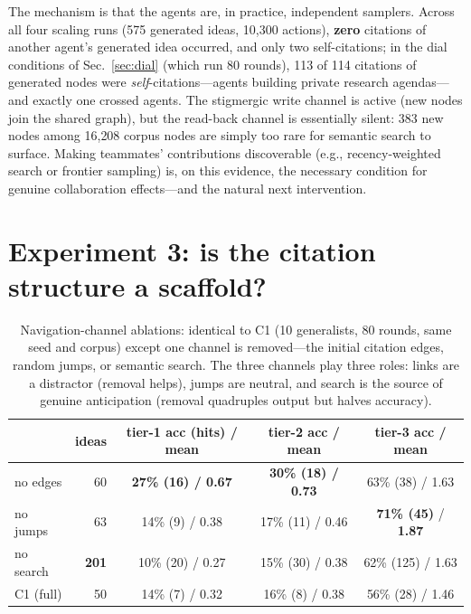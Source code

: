 \documentclass{article} %
\begin{document}
The mechanism is that the agents are, in practice, independent samplers.
Across all four scaling runs (575 generated ideas, 10{,}300 actions),
\textbf{zero} citations of another agent's generated idea occurred, and
only two self-citations; in the dial conditions of
Sec.~\ref{sec:dial} (which run 80 rounds), 113 of 114 citations of
generated nodes were \emph{self}-citations---agents building private
research agendas---and exactly one crossed agents. The stigmergic write
channel is active (new nodes join the shared graph), but the read-back
channel is essentially silent: 383 new nodes among 16{,}208 corpus nodes
are simply too rare for semantic search to surface. Making teammates'
contributions discoverable (e.g., recency-weighted search or frontier
sampling) is, on this evidence, the necessary condition for genuine
collaboration effects---and the natural next intervention.

\section{Experiment 3: is the citation structure a scaffold?}
\label{sec:noedges}

\begin{table}[t]
\caption{Navigation-channel ablations: identical to C1 (10 generalists,
80 rounds, same seed and corpus) except one channel is removed---the
initial citation edges, random jumps, or semantic search. The three
channels play three roles: links are a distractor (removal helps),
jumps are neutral, and search is the source of genuine anticipation
(removal quadruples output but halves accuracy).}
\label{tab:noedges}
\begin{center}\small
\begin{tabular}{lrccc}
\toprule
 & \textbf{ideas} & \textbf{tier-1 acc (hits) / mean} &
 \textbf{tier-2 acc / mean} & \textbf{tier-3 acc / mean} \\
\midrule
no edges & 60 & \textbf{27\% (16) / 0.67} & \textbf{30\% (18) / 0.73} & 63\% (38) / 1.63 \\
no jumps & 63 & 14\% (9) / 0.38 & 17\% (11) / 0.46 & \textbf{71\% (45)} / \textbf{1.87} \\
no search & \textbf{201} & 10\% (20) / 0.27 & 15\% (30) / 0.38 & 62\% (125) / 1.63 \\
C1 (full) & 50 & 14\% (7) / 0.32 & 16\% (8) / 0.38 & 56\% (28) / 1.46 \\
\bottomrule
\end{tabular}
\end{center}
\end{table}
\end{document}
